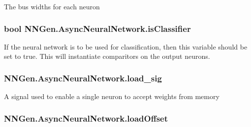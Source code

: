 The bus widths for each neuron 

\hypertarget{class_n_n_gen_1_1_async_neural_network_a07f0f12e804555587a5869b821e2ab0f}{}
\subsubsection[{is\+Classifier}]{\setlength{\rightskip}{0pt plus 5cm}bool N\+N\+Gen.\+Async\+Neural\+Network.\+is\+Classifier\hspace{0.3cm}{\ttfamily [get]}}\label{class_n_n_gen_1_1_async_neural_network_a07f0f12e804555587a5869b821e2ab0f}


If the neural network is to be used for classification, then this variable should be set to true. This will instantiate comparitors on the output neurons. 

\hypertarget{class_n_n_gen_1_1_async_neural_network_a4bb7830d6bbc7f19ea5eefdb49ab848a}{}
\subsubsection[{load\+\_\+sig}]{ N\+N\+Gen.\+Async\+Neural\+Network.\+load\+\_\+sig\hspace{0.3cm}{\ttfamily [get]}}\label{class_n_n_gen_1_1_async_neural_network_a4bb7830d6bbc7f19ea5eefdb49ab848a}


A signal used to enable a single neuron to accept weights from memory 

\hypertarget{class_n_n_gen_1_1_async_neural_network_aedc34ca8e8b46a154d3953776c809cd9}{}
\subsubsection[{load\+Offset}]{ N\+N\+Gen.\+Async\+Neural\+Network.\+load\+Offset\hspace{0.3cm}{\ttfamily [get]}}\label{class_n_n_gen_1_1_async_neural_network_aedc34ca8e8b46a154d3953776c809cd9}


